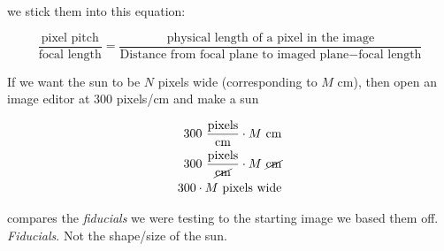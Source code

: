 \documentclass[10pt]{scrartcl}
\begin{document}
we stick them into this equation:

\begin{equation}
    \frac{\textrm{pixel pitch}}{\textrm{focal length}} = \frac{\textrm{physical length of a pixel in the image}}{\textrm{Distance from focal plane to imaged plane}-\textrm{focal length}}
\end{equation}

If we want the sun to be $N$ pixels wide (corresponding to $M$ cm), then open an image editor at 300 pixels/cm and make a sun 

\begin{align}
    300 ~\frac{\textrm{pixels}}{\textrm{cm}} \cdot M ~\textrm{cm}\\
    300 ~\frac{\textrm{pixels}}{\cancel{\textrm{cm}}} \cdot M ~\cancel{\textrm{cm}}\\
    300 \cdot M~\textrm{pixels wide}
\end{align}

 compares the \emph{fiducials} we were testing to the starting image we based them off. \emph{Fiducials}. Not the shape/size of the sun.

\begin{figure}[!ht]
\end{figure}
\end{document}
